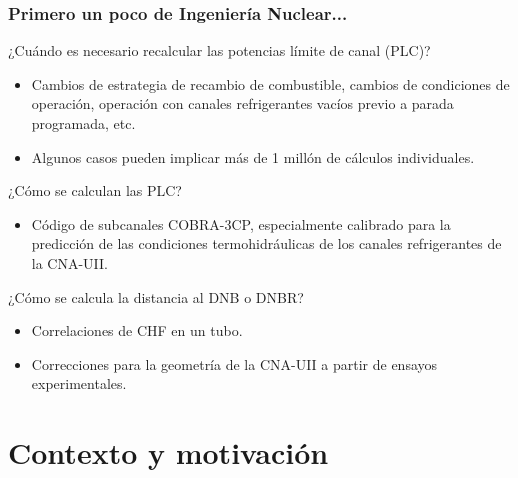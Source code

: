 \documentclass{beamer}
\begin{document}
\begin{frame}
    \frametitle{Primero un poco de Ingeniería Nuclear...}
    ¿Cuándo es necesario recalcular las potencias límite de canal (PLC)?
    \begin{itemize}
        \item Cambios de estrategia de recambio de combustible, cambios de condiciones de operación, operación con canales refrigerantes vacíos previo a parada programada, etc.
        \item Algunos casos pueden implicar más de 1 millón de cálculos individuales.
    \end{itemize}

    ¿Cómo se calculan las PLC?
    \begin{itemize}
        \item Código de subcanales COBRA-3CP, especialmente calibrado para la predicción de las condiciones termohidráulicas de los canales refrigerantes de la CNA-UII.
    \end{itemize}

    ¿Cómo se calcula la distancia al DNB o DNBR?
    \begin{itemize}
        \item Correlaciones de CHF en un tubo.
        \item Correcciones para la geometría de la CNA-UII a partir de ensayos experimentales.
    \end{itemize}
\end{frame}


\section{Contexto y motivación}
\end{document}
